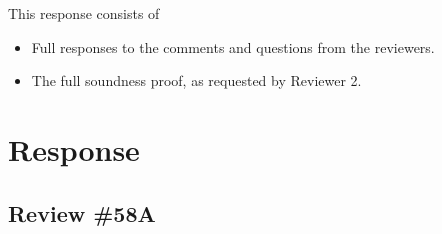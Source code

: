 \documentclass[anonymous,review]{acmart}
\begin{document}




\maketitle

This response consists of

\begin{itemize}
\item Full responses to the comments and questions from the reviewers.
\item The full soundness proof, as requested by Reviewer 2.
\end{itemize}

\newcommand{\reviewer}[1]{\textsl{#1}}
\newcommand{\response}[1]{\paragraph{\textbf{Response:}} #1}

\section{Response}

\subsection{Review \#58A}
\end{document}
